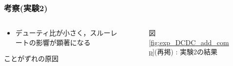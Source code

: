 \documentclass[mathsans]{beamer} %
\begin{document}
\begin{frame}
	\frametitle{考察(実験2)}
	\begin{columns}
		\begin{column}{.45\linewidth}
			\begin{itemize}
				\item デューティ比が小さく，スルーレートの影響が顕著になる
			\end{itemize}
			ことがずれの原因
		\end{column}
		\begin{column}{.5\linewidth}
			\begin{figure}[htbp]
				\begin{center}
					\vspace{-1em}
					\caption*{図 \ref{fig:exp_DCDC_add_comp}(再掲) : 実験2の結果}
				\end{center}
			\end{figure}
		\end{column}
	\end{columns}
\end{frame}
\end{document}
